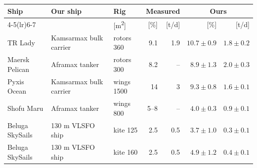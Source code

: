 \begin{tabular}{@{}lllrrrr@{}}
\toprule
Ship & Our ship & Rig & \multicolumn{2}{c}{Measured} & \multicolumn{2}{c}{Ours} \\
\cmidrule(lr){4-5}\cmidrule(lr){6-7}
 & & [\si{m^2}] & [\%] & [t/d] & [\%] & [t/d] \\
\midrule
TR Lady \citep{lr2025trlady} & Kamsarmax bulk carrier & rotors 360 & 9.1 & 1.9 & \(10.7 \pm 0.9\) & \(1.8 \pm 0.2\) \\
Maersk Pelican \citep{norsepower2019pelican} & Aframax tanker & rotors 300 & 8.2 & -- & \(8.9 \pm 1.3\) & \(2.0 \pm 0.3\) \\
Pyxis Ocean \citep{gcaptain2024pyxis} & Kamsarmax bulk carrier & wings 1500 & 14 & 3 & \(9.3 \pm 0.8\) & \(1.6 \pm 0.1\) \\
Shofu Maru \citep{mol2024shofu} & Aframax tanker & wings 800 & 5--8 & -- & \(4.0 \pm 0.3\) & \(0.9 \pm 0.1\) \\
Beluga SkySails \citep{verkehrsrundschau2008beluga} & 130 m VLSFO ship & kite 125 & 2.5 & 0.5 & \(3.7 \pm 1.0\) & \(0.3 \pm 0.1\) \\
Beluga SkySails \citep{verkehrsrundschau2008beluga} & 130 m VLSFO ship & kite 160 & 2.5 & 0.5 & \(4.9 \pm 1.2\) & \(0.4 \pm 0.1\) \\
\bottomrule
\end{tabular}
